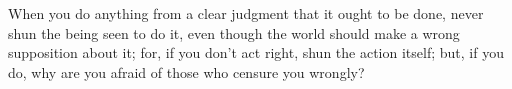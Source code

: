 When you do anything from a clear judgment that it ought to be
done, never shun the being seen to do it, even though the world should
make a wrong supposition about it; for, if you don't act right, shun
the action itself; but, if you do, why are you afraid of those who
censure you wrongly? 
